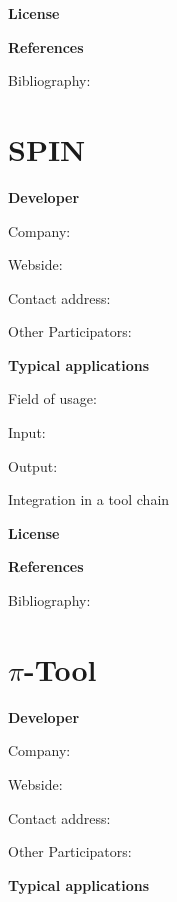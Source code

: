 	\textbf{License}


	\textbf{References}

	Bibliography:


\section{SPIN}

	\textbf{Developer}

	Company: 

	Webside:

	Contact address:

	Other  Participators:



	\textbf{Typical applications}

	Field of usage:


	Input:

	Output:





	Integration in a tool chain



	\textbf{License}


	\textbf{References}

	Bibliography:


\section{$\pi$-Tool}

	\textbf{Developer}

	Company: 

	Webside:

	Contact address:

	Other  Participators:



	\textbf{Typical applications}

